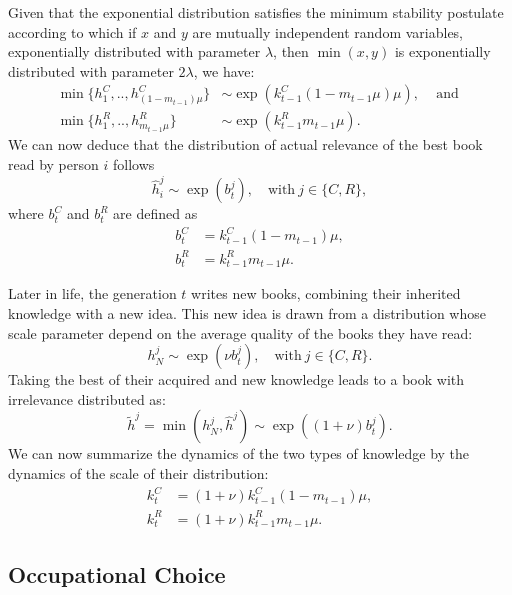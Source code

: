 \documentclass[12pt]{article}
\begin{document}
Given that the exponential distribution satisfies the minimum stability postulate according to which if $x$ and $y$ are mutually independent random variables, exponentially distributed with parameter $\lambda$, then $\min(x,y)$ is exponentially distributed with parameter $2\lambda$, we have:
\begin{align*}
\min\{h^C_1,..,h^C_{(1-m_{t-1}) \mu}\}& \sim \exp(k^C_{t-1} (1-m_{t-1}\mu) \mu),\;\;\;\mbox{ and }\\
\min\{h^R_1,..,h^R_{ m_{t-1} \mu }\}& \sim \exp(k^R_{t-1} m_{t-1} \mu).
 \end{align*}
We can now deduce that the distribution of actual relevance of the best book read by person $i$ follows
\begin{equation}
 \hat{h}^j_i \sim \exp(b_t^j), \quad \text{with} \ j\in \{C,R\},
\end{equation}
where $b_t^C$ and $b_t^R$ are defined as
 \begin{align*}
  b_{t}^C&=k_{t-1}^C (1-m_{t-1}) \mu, \\
  b_{t}^R&=k_{t-1}^R m_{t-1}  \mu.
 \end{align*}

Later in life, the generation $t$ writes new books,  combining their inherited knowledge with a new idea. This new idea is drawn from a distribution whose scale parameter depend on the average quality of the books they have read:
$$
h^j_N\sim  \exp(\nu b^j_t), \quad \text{with} \ j\in \{C,R\}.
$$
Taking the best of their acquired and new knowledge leads to a book with irrelevance distributed as:
$$
\tilde h^j=\min(h^j_N,\hat h^j) \sim  \exp((1+\nu) b^j_t).
$$
We can now summarize the dynamics of the two types of knowledge by the dynamics of the scale of their distribution:
 \begin{align}
  k_{t}^C&=(1+\nu) k_{t-1}^C (1-m_{t-1}) \mu,\label{eq:kCtime} \\
  k_{t}^R&=(1+\nu) k_{t-1}^R m_{t-1} \label{eq:kRtime} \mu.
 \end{align}


 \subsection{Occupational Choice}
\end{document}
